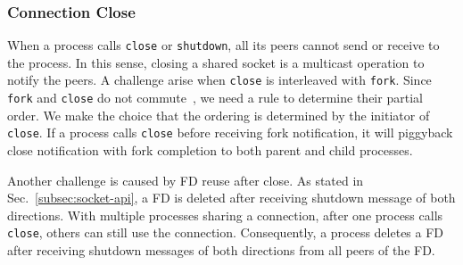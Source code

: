 \subsubsection{Connection Close}
\label{subsubsec:fork_close}



When a process calls \texttt{close} or \texttt{shutdown}, all its peers cannot send or receive to the process. In this sense, closing a shared socket is a multicast operation to notify the peers. A challenge arise when \texttt{close} is interleaved with \texttt{fork}. Since \texttt{fork} and \texttt{close} do not commute~\cite{clements2015scalable}, we need a rule to determine their partial order. We make the choice that the ordering is determined by the initiator of \texttt{close}. If a process calls \texttt{close} before receiving fork notification, it will piggyback close notification with fork completion to both parent and child processes.

Another challenge is caused by FD reuse after close. As stated in Sec.~\ref{subsec:socket-api}, a FD is deleted after receiving shutdown message of both directions. With multiple processes sharing a connection, after one process calls \texttt{close}, others can still use the connection. Consequently, a process deletes a FD after receiving shutdown messages of both directions from all peers of the FD.


